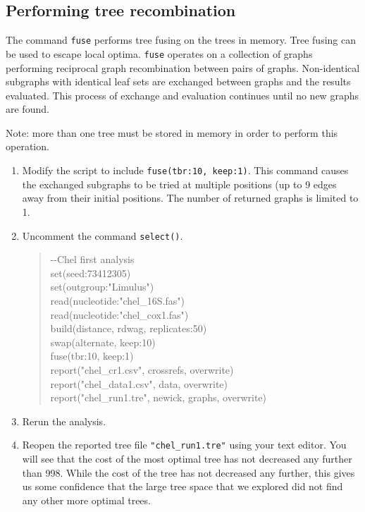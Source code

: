 \documentclass[]{article}
\begin{document}
\subsection{Performing tree recombination}
\label{subsec:Fusing}

The command \texttt{fuse} performs tree fusing on the trees in memory. Tree 
fusing can be used to escape local optima. \texttt{fuse} operates on a collection 
of graphs performing reciprocal graph recombination between pairs of graphs. 
Non-identical subgraphs with identical leaf sets are exchanged between graphs 
and the results evaluated. This process of exchange and evaluation continues 
until no new graphs are found. 

Note: more than one tree must be stored in memory in order to perform this operation.

\begin{enumerate}

\item Modify the script to include \texttt{fuse(tbr:10, keep:1)}. This command 
causes the exchanged subgraphs to be tried at multiple positions (up to 9 
edges away from their initial positions. The number of returned graphs is 
limited to 1.

\item Uncomment the command \texttt{select()}.

	\begin{quote}
	-\/-Chel first analysis\\
	set(seed:73412305)\\
	set(outgroup:"Limulus")\\
	read(nucleotide:"chel\_16S.fas")\\
	read(nucleotide:"chel\_cox1.fas")\\
	build(distance, rdwag, replicates:50)\\
	swap(alternate, keep:10)\\
	fuse(tbr:10, keep:1)\\
	report("chel\_cr1.csv", crossrefs, overwrite)\\
	report("chel\_data1.csv", data, overwrite)\\
	report("chel\_run1.tre", newick, graphs, overwrite)\\
	\end{quote}
	
\item Rerun the analysis.

\item Reopen the reported tree file \texttt{"chel\_run1.tre"} using your text editor.
You will see that the cost of the most optimal tree has not decreased any further 
than 998. While the cost of the tree has not decreased any further, this gives us
some confidence that the large tree space that we explored did not find any
other more optimal trees.

\end{enumerate}
\end{document}
